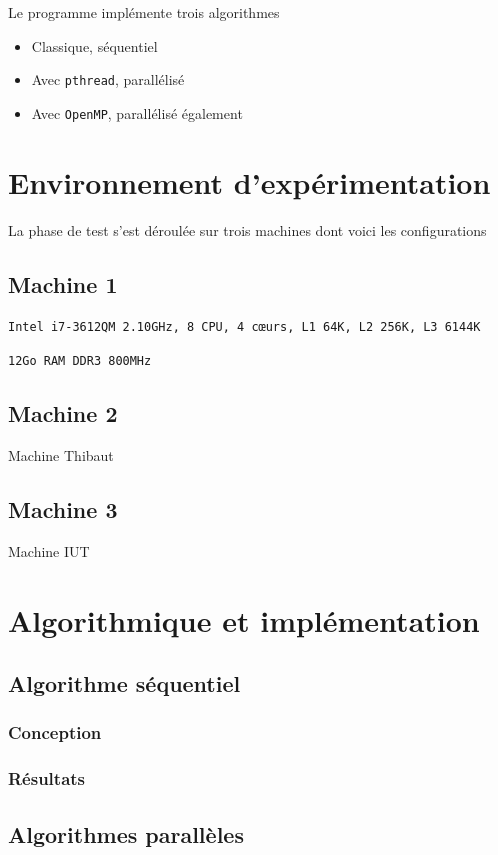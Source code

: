 \documentclass[12pt]{article}
\begin{document}
Le programme implémente trois algorithmes
\begin{itemize}
	\item Classique, séquentiel
	\item Avec \texttt{pthread}\cite{pthreads}, parallélisé
	\item Avec \texttt{OpenMP}, parallélisé également
\end{itemize}

\section{Environnement d'expérimentation}
La phase de test s'est déroulée sur trois machines dont voici les configurations

\subsection{Machine 1}
\texttt{Intel i7-3612QM 2.10GHz, 8 CPU, 4 cœurs, L1 64K, L2 256K, L3 6144K}

\texttt{12Go RAM DDR3 800MHz}

\subsection{Machine 2}
Machine Thibaut

\subsection{Machine 3}
Machine IUT

\section{Algorithmique et implémentation}
	\subsection{Algorithme séquentiel}
		\subsubsection{Conception}
		\subsubsection{Résultats}

	\subsection{Algorithmes parallèles}
\end{document}

